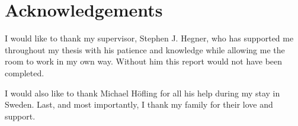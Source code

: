 \chapter{Acknowledgements}
\label{chap:acknowledgements}
I would like to thank my supervisor, Stephen J. Hegner, who has supported me 
throughout my thesis with his patience and knowledge 
while allowing me the room to work in my own way. 
Without him this report would not have been completed.

I would also like to thank Michael H\"ofling for all his help during my stay in Sweden.
Last, and most importantly, I thank my family for their love and support.